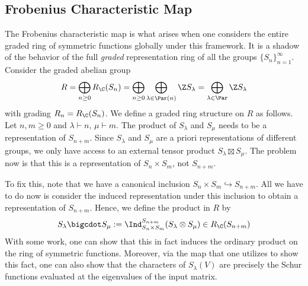 \documentclass[../main.tex]{subfiles}
\begin{document}
\subsection{Frobenius Characteristic Map}
The Frobenius characteristic map is what arises when one considers the entire graded ring of symmetric functions globally under this framework. It is a shadow of the behavior of the full \textit{graded} representation ring of all the groups $ \{S_{n}\}_{n=1}^{\infty} $. Consider the graded abelian group
\[
  R = \bigoplus_{n\geq0} R_{\C}(S_{n}) =\bigoplus_{n\geq0} \bigoplus_{\lambda\in \Par(n)} \Z S_{\lambda} = \bigoplus_{\lambda\in \Par} \Z S_{\lambda}
\]
with grading $ R_{n} = R_{\C}(S_{n}) $. We define a graded ring structure on $ R $ as follows. Let $ n,m\geq 0 $ and $\lambda\vdash n $, $ \mu\vdash m $. The product of $ S_{\lambda} $  and $ S_{\mu} $ needs to be a representation of $ S_{n+m} $. Since $ S_{\lambda} $ and $ S_{\mu} $ are a priori representations of different groups, we only have access to an external tensor product $ S_{\lambda}\boxtimes S_{\mu} $. The problem now is that this is a representation of $ S_{n}\times S_{m} $, not $ S_{n+m} $.

To fix this, note that we have a canonical inclusion $ S_{n}\times S_{m}\hookrightarrow S_{n+m} $. All we have to do now is consider the induced representation under this inclusion to obtain a representation of $ S_{n+m} $. Hence, we define the product in $ R $ by 
\[
  S_{\lambda}\bigcdot S_{\mu} := \Ind_{S_{n}\times S_{m}}^{S_{n+m}} (S_{\lambda}\otimes S_{\mu}) \in R_{\C}(S_{n+m})
\]
With some work, one can show that this in fact induces the ordinary product on the ring of symmetric functions. Moreover, via the map that one utilizes to show this fact, one can also show that the characters of $ S_{\lambda}(V) $ are precisely the Schur functions evaluated at the eigenvalues of the input matrix.
\end{document}
